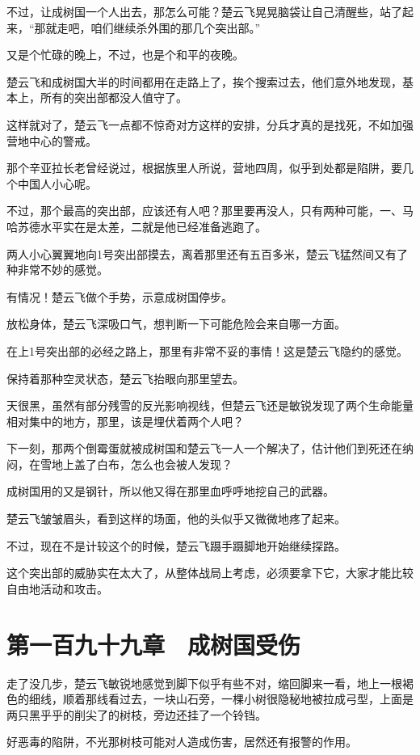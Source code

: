 不过，让成树国一个人出去，那怎么可能？楚云飞晃晃脑袋让自己清醒些，站了起来，“那就走吧，咱们继续杀外围的那几个突出部。”

又是个忙碌的晚上，不过，也是个和平的夜晚。

楚云飞和成树国大半的时间都用在走路上了，挨个搜索过去，他们意外地发现，基本上，所有的突出部都没人值守了。

这样就对了，楚云飞一点都不惊奇对方这样的安排，分兵才真的是找死，不如加强营地中心的警戒。

那个辛亚拉长老曾经说过，根据族里人所说，营地四周，似乎到处都是陷阱，要几个中国人小心呢。

不过，那个最高的突出部，应该还有人吧？那里要再没人，只有两种可能，一、马哈苏德水平实在是太差，二就是他已经准备逃跑了。

两人小心翼翼地向1号突出部摸去，离着那里还有五百多米，楚云飞猛然间又有了种非常不妙的感觉。

有情况！楚云飞做个手势，示意成树国停步。

放松身体，楚云飞深吸口气，想判断一下可能危险会来自哪一方面。

在上1号突出部的必经之路上，那里有非常不妥的事情！这是楚云飞隐约的感觉。

保持着那种空灵状态，楚云飞抬眼向那里望去。

天很黑，虽然有部分残雪的反光影响视线，但楚云飞还是敏锐发现了两个生命能量相对集中的地方，那里，该是埋伏着两个人吧？

下一刻，那两个倒霉蛋就被成树国和楚云飞一人一个解决了，估计他们到死还在纳闷，在雪地上盖了白布，怎么也会被人发现？

成树国用的又是钢针，所以他又得在那里血呼呼地挖自己的武器。

楚云飞皱皱眉头，看到这样的场面，他的头似乎又微微地疼了起来。

不过，现在不是计较这个的时候，楚云飞蹑手蹑脚地开始继续探路。

这个突出部的威胁实在太大了，从整体战局上考虑，必须要拿下它，大家才能比较自由地活动和攻击。

\section{第一百九十九章　成树国受伤}

走了没几步，楚云飞敏锐地感觉到脚下似乎有些不对，缩回脚来一看，地上一根褐色的细线，顺着那线看过去，一块山石旁，一棵小树很隐秘地被拉成弓型，上面是两只黑乎乎的削尖了的树枝，旁边还挂了一个铃铛。

好恶毒的陷阱，不光那树枝可能对人造成伤害，居然还有报警的作用。

